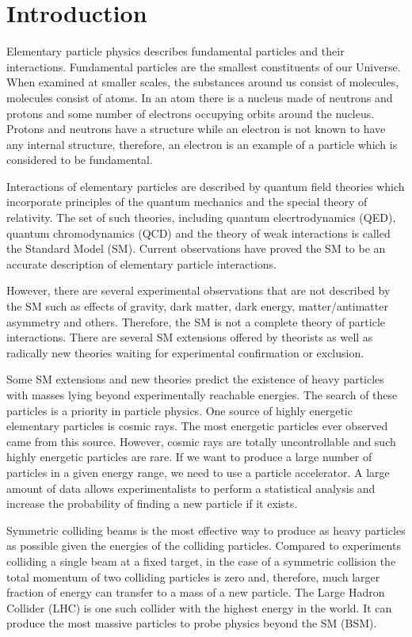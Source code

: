 \chapter{Introduction}
\label{sec:intro}

Elementary particle physics describes fundamental particles and their interactions. Fundamental particles are the smallest constituents of our Universe. When examined at smaller scales, the substances around us consist of molecules, molecules consist of atoms. In an atom there is a nucleus made of neutrons and protons and some number of electrons occupying orbits around the nucleus. Protons and neutrons have a structure while an electron is not known to have any internal structure, therefore, an electron is an example of a particle which is considered to be fundamental.

Interactions of elementary particles are described by quantum field theories which incorporate principles of the quantum mechanics and the special theory of relativity. The set of such theories, including quantum elecrtrodynamics (QED), quantum chromodynamics (QCD) and the theory of weak interactions is called the Standard Model (SM). Current observations have proved the SM to be an accurate description of elementary particle interactions.  

However, there are several experimental observations that are not described by the SM such as effects of gravity, dark matter, dark energy, matter/antimatter asymmetry and others. Therefore, the SM is not a complete theory of particle interactions. There are several SM extensions offered by theorists as well as radically new theories waiting for experimental confirmation or exclusion. 

Some SM extensions and new theories predict the existence of heavy particles with masses lying beyond experimentally reachable energies. The search of these particles is a priority in particle physics. One source of highly energetic elementary particles is cosmic rays. The most energetic particles ever observed came from this source. However, cosmic rays are totally uncontrollable and such highly energetic particles are rare. If we want to produce a large number of particles in a given energy range, we need to use a particle accelerator. A large amount of data allows experimentalists to perform a statistical analysis and increase the probability of finding a new particle if it exists.

Symmetric colliding beams is the most effective way to produce as heavy particles as possible given the energies of the colliding particles. Compared to experiments colliding a single beam at a fixed target, in the case of a symmetric collision the total momentum of two colliding particles is zero and, therefore, much larger fraction of energy can transfer to a mass of a new particle.  The Large Hadron Collider (LHC) is one such collider with the highest energy in the world. It can produce the most massive particles to probe physics beyond the SM (BSM). 

